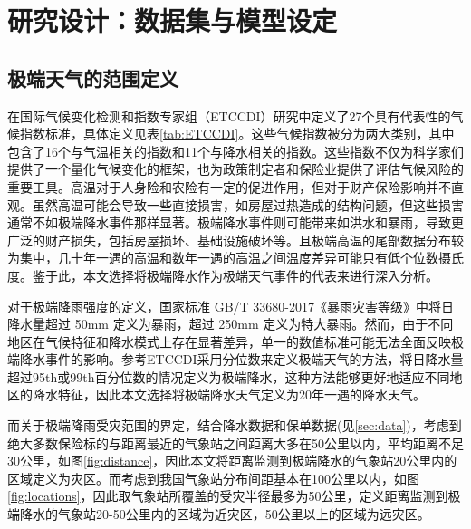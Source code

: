 \chapter{研究设计：数据集与模型设定}\label{chap:3}
\section{极端天气的范围定义}\label{sec:def}

在国际气候变化检测和指数专家组（ETCCDI）研究\citep{alexander2006global}中定义了27个具有代表性的气候指数标准，具体定义见表\ref{tab:ETCCDI}。这些气候指数被分为两大类别，其中包含了16个与气温相关的指数和11个与降水相关的指数。这些指数不仅为科学家们提供了一个量化气候变化的框架，也为政策制定者和保险业提供了评估气候风险的重要工具。高温对于人身险\citep{马姝瑞2014}和农险\citep{梁来存2019气温天气指数保险的费率厘定}有一定的促进作用，但对于财产保险影响并不直观。虽然高温可能会导致一些直接损害，如房屋过热造成的结构问题，但这些损害通常不如极端降水事件那样显著。极端降水事件则可能带来如洪水和暴雨，导致更广泛的财产损失，包括房屋损坏、基础设施破坏等。且极端高温的尾部数据分布较为集中\citep{尹红2019基于}，几十年一遇的高温和数年一遇的高温之间温度差异可能只有低个位数摄氏度。鉴于此，本文选择将极端降水作为极端天气事件的代表来进行深入分析。


对于极端降雨强度的定义，国家标准 GB/T 33680-2017《暴雨灾害等级》中将日降水量超过 50mm 定义为暴雨，超过 250mm 定义为特大暴雨。然而，由于不同地区在气候特征和降水模式上存在显著差异，单一的数值标准可能无法全面反映极端降水事件的影响。参考ETCCDI采用分位数来定义极端天气的方法，将日降水量超过95th或99th百分位数的情况定义为极端降水，这种方法能够更好地适应不同地区的降水特征，因此本文选择将极端降水天气定义为20年一遇的降水天气。

而关于极端降雨受灾范围的界定，结合降水数据和保单数据(见\ref{sec:data})，考虑到绝大多数保险标的与距离最近的气象站之间距离大多在50公里以内，平均距离不足30公里，如图\ref{fig:distance}，因此本文将距离监测到极端降水的气象站20公里内的区域定义为灾区。而考虑到我国气象站分布间距基本在100公里以内，如图\ref{fig:locations}，因此取气象站所覆盖的受灾半径最多为50公里，定义距离监测到极端降水的气象站20-50公里内的区域为近灾区，50公里以上的区域为远灾区。

